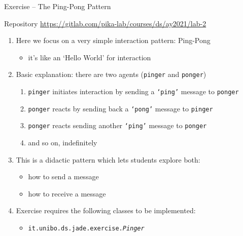 \documentclass{beamer}\mode<presentation>{\usetheme{AMSCesenaPurpleAndGold}}
\begin{document}
\begin{frame}[c,allowframebreaks]{Exercise \currentExercise{} -- The Ping-Pong Pattern}
	
	\begin{block}{Repository}\centering
		\url{https://gitlab.com/pika-lab/courses/ds/ay2021/lab-2}
	\end{block}
	
	\bigskip
	
	\begin{enumerate}
		
		\item Here we focus on a very simple interaction pattern: Ping-Pong
		\begin{itemize}
			\item it's like an `Hello World' for interaction
		\end{itemize}
	
		\medskip
		
		\item Basic explanation: there are two agents (\texttt{pinger} and \texttt{ponger})
		\begin{enumerate}
			\item \texttt{pinger} initiates interaction by sending a \texttt{`ping'} message to \texttt{ponger}
			\item \texttt{ponger} reacts by sending back a \texttt{`pong'} message to \texttt{pinger}
			\item \texttt{ponger} reacts sending another \texttt{`ping'} message to \texttt{ponger}
			\item and so on, indefinitely
		\end{enumerate}
	
		\framebreak
		
		\item This is a didactic pattern which lets students explore both:
		\begin{itemize}
			\item how to send a message
			\item how to receive a message
		\end{itemize}
	
		\medskip
	
		\item Exercise \currentExercise{} requires the following classes to be implemented:
		\begin{itemize}
			\item \texttt{it.unibo.ds.jade.\alert{exercise.\textit{Pinger}}}
		\end{itemize}
		

\end{enumerate}
\end{frame}
\end{document}
